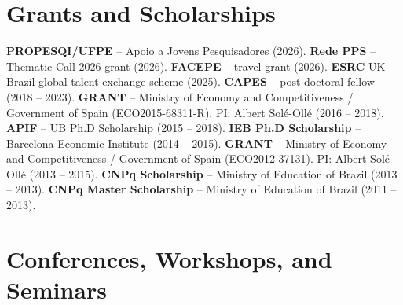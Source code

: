 \documentclass[a4paper,9pt]{article}
\begin{document}
\section{Grants and Scholarships}

\noindent \textbf{PROPESQI/UFPE} -- Apoio a Jovens Pesquisadores (2026). \textbf{Rede PPS} -- Thematic Call 2026 grant (2026). \textbf{FACEPE} -- travel grant (2026). \textbf{ESRC} UK-Brazil global talent exchange scheme (2025). \textbf{CAPES} -- post-doctoral fellow (2018 -- 2023). \textbf{GRANT} -- Ministry of Economy and Competitiveness / Government of Spain (ECO2015-68311-R). PI: Albert Sol\'e-Oll\'e (2016 -- 2018). \textbf{APIF} -- UB Ph.D Scholarship (2015 -- 2018). \textbf{IEB Ph.D Scholarship} -- Barcelona Economic Institute (2014 -- 2015). \textbf{GRANT} -- Ministry of Economy and Competitiveness / Government of Spain (ECO2012-37131). PI: Albert Sol\'e-Oll\'e (2013 -- 2015). \textbf{CNPq Scholarship} -- Ministry of Education of Brazil (2013 -- 2013). \textbf{CNPq Master Scholarship} -- Ministry of Education of Brazil (2011 -- 2013).

\vspace*{0.1mm}

\section{Conferences, Workshops, and Seminars}
\end{document}
